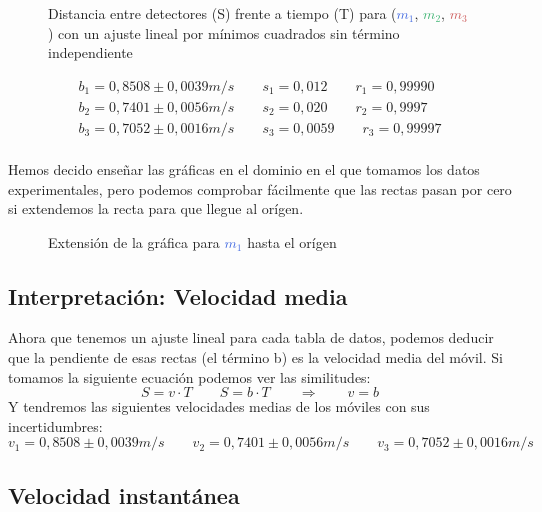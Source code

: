 \documentclass[12pt, a4paper, titlepage]{article}
\begin{document}
  \begin{figure}[H]
    \centering
     
    
    \caption{Distancia entre detectores (S) frente a tiempo (T) para  (\textcolor{RoyalBlue}{$m_1$}, \textcolor{MediumSeaGreen}{$m_2$}, \textcolor{IndianRed}{$m_3$}) con un ajuste lineal por mínimos cuadrados sin término independiente}
  \end{figure}
  \begin{gather*}
    b_1 = 0,8508 \pm 0,0039 m/s \qquad s_1 = 0,012 \qquad r_1 = 0,99990 \\
    b_2 = 0,7401 \pm 0,0056 m/s \qquad s_2 = 0,020 \qquad r_2 = 0,9997 \\
    b_3 = 0,7052 \pm 0,0016 m/s \qquad s_3 = 0,0059 \qquad r_3 = 0,99997 \\
  \end{gather*}

  Hemos decido enseñar las gráficas en el dominio en el que tomamos los datos experimentales, pero podemos comprobar fácilmente que las rectas pasan por cero si extendemos la recta para que llegue al orígen.

  \begin{figure}[H]
    \hspace{3.5em} 
    \caption{Extensión de la gráfica para \textcolor{RoyalBlue}{$m_1$} hasta el orígen}
  \end{figure}

  \subsection{Interpretación: Velocidad media}

  Ahora que tenemos un ajuste lineal para cada tabla de datos, podemos deducir que la pendiente de esas rectas (el término b) es la velocidad media del móvil. Si tomamos la siguiente ecuación podemos ver las similitudes:
  \begin{equation}
    S = v \cdot T \qquad S = b \cdot T \qquad \Rightarrow  \qquad v = b
  \end{equation}
  Y tendremos las siguientes velocidades medias de los móviles con sus incertidumbres:
  \begin{equation*}
    v_1 = 0,8508 \pm 0,0039 m/s \qquad v_2 = 0,7401 \pm 0,0056 m/s \qquad v_3 = 0,7052 \pm 0,0016 m/s
  \end{equation*}

  \subsection{Velocidad instantánea}
\end{document}
